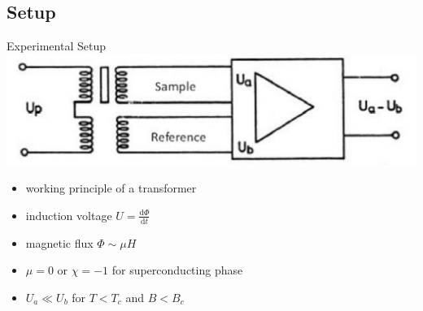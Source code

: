 \documentclass{beamer}
\begin{document}
\subsection{Setup} %
\begin{frame}{Experimental Setup}
\includegraphics[height=0.2\textheight]{img/detail.pdf}
\begin{itemize}[<+->]
\item working principle of a transformer
\item induction voltage $U = \frac{\mathrm{d}\Phi}{\mathrm d t} $
\item magnetic flux $\Phi \sim \mu H$
\item $\mu=0$ or $\chi=-1$ for superconducting phase
\item $U_a \ll U_b$ for $T<T_c$ and $B<B_c$
\end{itemize}



\end{frame}

\end{document}

